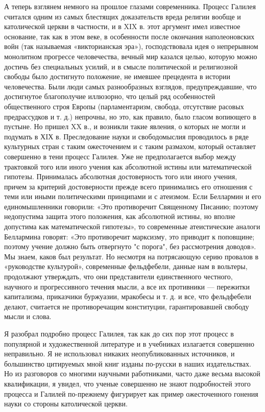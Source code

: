 А  теперь взглянем  немного на  прошлое глазами  современника. Процесс
Галилея считался одним из  самых блестящих доказательств вреда религии
вообще и  католической церкви в  частности, и  в XIX в.  этот аргумент
имел известное  основание, так  как в этом  веке, в  особенности после
окончания  наполеоновских войн  (так называемая  «викторианская эра»),
господствовала идея  о непрерывном монолитном  прогрессе человечества,
вечный  мир  казался  целью,  которую можно  достичь  без  специальных
усилий, и в смысле политической  и религиозной свободы было достигнуто
положение,  не   имевшее  прецедента  в  истории   человечества.  Были
люди  самых разнообразных  взглядов, предупреждавшие,  что достигнутое
благополучие иллюзорно, что целый ряд особенностей общественного строя
Европы (парламентаризм, свобода, отсутствие расовых предрассудков и т.
д.) непрочны, но это, как правило, было гласом вопиющего в пустыне. Но
пришел XX в., и возникли такие  явления, о которых не могли и подумать
в  ХIХ  в. Преследование  науки  и  свободомыслия проводилось  в  ряде
культурных  стран с  таким ожесточением  и с  таким размахом,  который
оставляет  совершенно в  тени процесс  Галилея. Уже  не предполагается
выбор между  трактовкой того  или иного  учения как  абсолютной истины
или  математической  гипотезы.  Принималась  абсолютная  достоверность
того  или  иного  учения,  причем  за  критерий  достоверности  прежде
всего  принимались  его  отношения  с  теми  или  иными  политическими
принципами  и  с  атеизмом.   Если  Беллармин  и  его  единомышленники
говорили:  «Это противоречит  Священному Писанию;  поэтому недопустима
защита  этого положения,  как абсолютной  истины, но  вполне допустима
как  математической гипотезы»,  то  современные атеистические  аналоги
Беллармина  говорят:  «Это  противоречит  марксизму,  это  приводит  к
поповщине;  поэтому  учение должно  быть  отвергнуто  "с порога",  без
рассмотрения доводов». Мы  знаем, каков был результат.  Но несмотря на
потрясающую  серию  провалов  в «руководстве  культурой»,  современные
фельдфебели,  данные  нам  в   вольтеры,  продолжают  утверждать,  что
они  представители единственного  честного, научного  и прогрессивного
течения  мысли,  а  все   их  противники  ---  пережитки  капитализма,
приказчики буржуазии, мракобесы и т. д. и все, что фельдфебели делают,
считается не противоречащим конституции, гарантировавшей свободу мысли
и слова.

Я разобрал подробно процесс Галилея, так как до сих пор этот процесс в
популярной  и  художественной  литературе  и  в  учебниках  излагается
совершенно  неправильно.  Я  не использовал  никаких  неопубликованных
источников,  и большинство  цитируемых  мной книг  изданы по-русски  в
наших издательствах. Но из разговоров со многими научными работниками,
часто  даже   весьма  высокой  квалификации,  я   увидел,  что  ученые
совершенно не знают подробностей  этого процесса и Галилей по-прежнему
фигурирует  как   пример  ожесточенного   гонения  науки   со  стороны
католической церкви.

